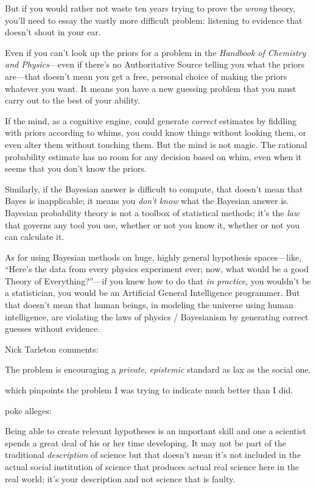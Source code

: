 {
 But if you would rather not waste ten years trying to prove the
\textit{wrong} theory, you'll need to essay the vastly
more difficult problem: listening to evidence that
doesn't shout in your ear.}

{
 Even if you can't look up the priors for a problem
in the \textit{Handbook of Chemistry and Physics}{}---even if
there's no Authoritative Source telling you what the
priors are---that doesn't mean you get a free, personal
choice of making the priors whatever you want. It means you have a new
guessing problem that you must carry out to the best of your ability.}

{
 If the mind, as a cognitive engine, could generate
\textit{correct} estimates by fiddling with priors according to whims,
you could know things without looking them, or even alter them without
touching them. But the mind is not magic. The rational probability
estimate has no room for any decision based on whim, even when it seems
that you don't know the priors.}

{
 Similarly, if the Bayesian answer is difficult to compute, that
doesn't mean that Bayes is inapplicable; it means you
\textit{don't know} what the Bayesian answer is.
Bayesian probability theory is not a toolbox of statistical methods;
it's the \textit{law} that governs any tool you use,
whether or not you know it, whether or not you can calculate it.}

{
 As for using Bayesian methods on huge, highly general hypothesis
spaces---like, ``Here's the data from
every physics experiment ever; now, what would be a good Theory of
Everything?''---if you knew how to do that \textit{in
practice}, you wouldn't be a statistician, you would be
an Artificial General Intelligence programmer. But that
doesn't mean that human beings, in modeling the
universe using human intelligence, are violating the laws of physics /
Bayesianism by generating correct guesses without evidence.}

{
 Nick Tarleton comments:}

{
 The problem is encouraging a \textit{private}, \textit{epistemic}
standard as lax as the social one.}

{
 which pinpoints the problem I was trying to indicate much better
than I did.}

\myendsectiontext


{
 poke alleges:}

{
 Being able to create relevant hypotheses is an important skill and
one a scientist spends a great deal of his or her time developing. It
may not be part of the traditional \textit{description} of science but
that doesn't mean it's not included in
the actual social institution of science that produces actual real
science here in the real world; it's your description
and not science that is faulty.}

